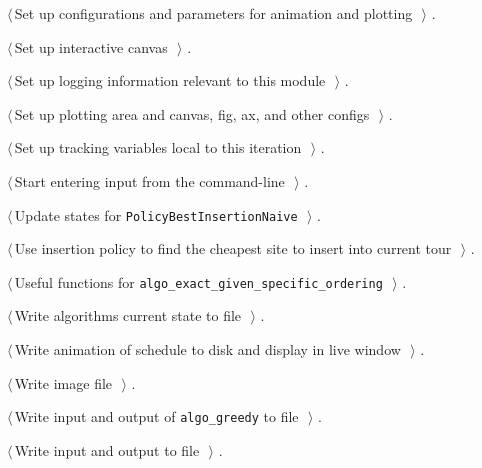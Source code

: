 \documentclass[11.5pt]{report}
\begin{document}
{\begin{list}{}{\setlength{\itemsep}{-\parsep}\setlength{\itemindent}{-\leftmargin}}
\item $\langle\,$Set up configurations and parameters for animation and plotting\nobreak\ {\footnotesize {}}$\,\rangle$ {\footnotesize {\NWtxtRefIn} .}
\item $\langle\,$Set up interactive canvas\nobreak\ {\footnotesize {}}$\,\rangle$ {\footnotesize {\NWtxtRefIn} .}
\item $\langle\,$Set up logging information relevant to this module\nobreak\ {\footnotesize {}}$\,\rangle$ {\footnotesize {\NWtxtRefIn} .}
\item $\langle\,$Set up plotting area and canvas, fig, ax, and other configs\nobreak\ {\footnotesize {}}$\,\rangle$ {\footnotesize {\NWtxtRefIn} .}
\item $\langle\,$Set up tracking variables local to this iteration\nobreak\ {\footnotesize {}}$\,\rangle$ {\footnotesize {\NWtxtRefIn} .}
\item $\langle\,$Start entering input from the command-line\nobreak\ {\footnotesize {}}$\,\rangle$ {\footnotesize {\NWtxtRefIn} .}
\item $\langle\,$Update states for \texttt{PolicyBestInsertionNaive}\nobreak\ {\footnotesize {}}$\,\rangle$ {\footnotesize {\NWtxtRefIn} .}
\item $\langle\,$Use insertion policy to find the cheapest site to insert into current tour\nobreak\ {\footnotesize {}}$\,\rangle$ {\footnotesize {\NWtxtRefIn} .}
\item $\langle\,$Useful functions for \verb|algo_exact_given_specific_ordering|\nobreak\ {\footnotesize {}}$\,\rangle$ {\footnotesize {\NWtxtRefIn} .}
\item $\langle\,$Write algorithms current state to file\nobreak\ {\footnotesize {}}$\,\rangle$ {\footnotesize {\NWtxtRefIn} .}
\item $\langle\,$Write animation of schedule to disk and display in live window\nobreak\ {\footnotesize {}}$\,\rangle$ {\footnotesize {\NWtxtRefIn} .}
\item $\langle\,$Write image file\nobreak\ {\footnotesize {}}$\,\rangle$ {\footnotesize {\NWtxtRefIn} .}
\item $\langle\,$Write input and output of \verb|algo_greedy| to file\nobreak\ {\footnotesize {}}$\,\rangle$ {\footnotesize {\NWtxtRefIn} .}
\item $\langle\,$Write input and output to file\nobreak\ {\footnotesize {}}$\,\rangle$ {\footnotesize {\NWtxtRefIn} .}
\end{list}}
\end{document}
